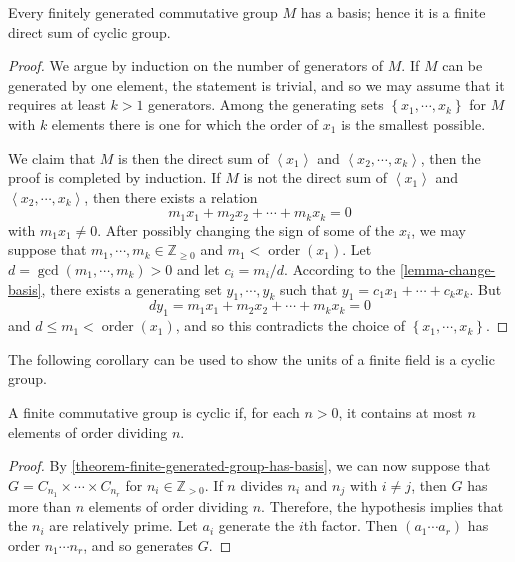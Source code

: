 \begin{theorem}
  \label{theorem-finite-generated-group-has-basis}
  Every finitely generated commutative group \( M \) has a basis;
  hence it is a finite direct sum of cyclic group.
\end{theorem}
\begin{proof}
  We argue by induction on the number of generators of \( M \).
  If \( M \) can be generated by one element, the statement is trivial, and so we may assume that it requires at least \( k > 1 \) generators.
  Among the generating sets \( \left\lbrace x_1, \cdots, x_k \right\rbrace \) for \( M \) with \( k \) elements there is one for which the order of \( x_1 \) is the smallest possible.

  We claim that \( M \) is then the direct sum of \( \left\langle x_1 \right\rangle \) and \( \left\langle x_2, \cdots, x_k \right\rangle \), then the proof is completed by induction.
    If \( M \) is not the direct sum of \( \left\langle x_1 \right\rangle \) and \( \left\langle x_2, \cdots, x_k \right\rangle \), then there exists a relation
    \[
      m_1 x_1 + m_2 x_2 + \cdots + m_k x_k = 0
    \]
    with \( m_1 x_1 \neq 0 \).
    After possibly changing the sign of some of the \( x_i \), we may suppose that \( m_1, \cdots, m_k \in \mathbb{Z}_{\geq 0} \) and \( m_1 < \operatorname{order}(x_1) \).
    Let \( d = \gcd (m_1, \cdots, m_k) > 0 \) and let \( c_i = m_i / d \).
    According to the \ref{lemma-change-basis}, there exists a generating set \( y_1, \cdots, y_k \) such that \( y_1 = c_1 x_1 + \cdots + c_k x_k \).
    But
    \[
      d y_1 = m_1 x_1 + m_2 x_2 + \cdots + m_k x_k = 0
    \]
    and \( d \leq m_1 < \operatorname{order}(x_1) \), and so this contradicts the choice of \( \left\lbrace x_1, \cdots, x_k \right\rbrace \).
\end{proof}

The following corollary can be used to show the units of a finite field is a cyclic group.
\begin{corollary}
  \label{corollary-commutative-group-cyclic-if-condition}
  A finite commutative group is cyclic if, for each \( n > 0 \), it contains at most \( n \) elements of order dividing \( n \).
\end{corollary}
\begin{proof}
  By \ref{theorem-finite-generated-group-has-basis}, we can now suppose that \( G = C_{n_1} \times \cdots \times C_{n_r} \) for \( n_i \in \mathbb{Z}_{> 0} \).
  If \( n \) divides \( n_i \) and \( n_j \) with \( i \neq j \), then \( G \) has more than \( n \) elements of order dividing \( n \).
  Therefore, the hypothesis implies that the \( n_i \) are relatively prime.
  Let \( a_i \) generate the \( i \)th factor.
  Then \( (a_1 \cdots a_r ) \) has order \( n_1\cdots n_r \), and so generates \( G \).
\end{proof}

